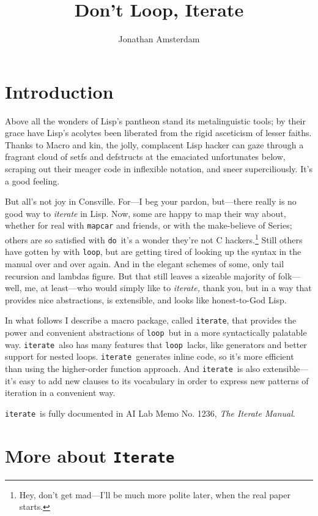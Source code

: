 \documentclass[12pt]{article}
\newcommand{\lisp}{\tt}
\newcommand{\iter}{{\lisp iterate}}
\newcommand{\Iter}{{\lisp Iterate}}
\newcommand{\Do}{{\lisp do}}
\newcommand{\looP}{{\lisp loop}}
\newcommand{\iman}{{\em The Iterate Manual\/}}
\begin{document}
\title{Don't Loop, Iterate}
\author{Jonathan Amsterdam}

\maketitle

\section{Introduction}

Above all the wonders of Lisp's pantheon stand its metalinguistic
tools; by their grace have Lisp's acolytes been liberated from the
rigid asceticism of lesser faiths.  Thanks to Macro and kin, the
jolly, complacent Lisp hacker can gaze through a fragrant cloud of
setfs and defstructs at the emaciated unfortunates below, scraping out
their meager code in inflexible notation, and sneer superciliously.
It's a good feeling.

But all's not joy in Consville.  For---I beg your pardon, but---there
really is no good way to {\em iterate\/} in Lisp.  Now, some are happy
to map their way about, whether for real with {\lisp mapcar} and
friends, or with the make-believe of Series; others are so satisfied
with \Do\ it's a wonder they're not C hackers.\footnote{Hey, don't get
mad---I'll be much more polite later, when the real paper starts.}
Still others have gotten by with \looP, but are getting tired of
looking up the syntax in the manual over and over again.  And in the
elegant schemes of some, only tail recursion and lambdas figure.  But
that still leaves a sizeable majority of folk---well, me, at
least---who would simply like to {\em iterate,} thank you, but in a
way that provides nice abstractions, is extensible, and looks like
honest-to-God Lisp.

In what follows I describe a macro package, called \iter, that
provides the power and convenient abstractions of \looP\ but in a more
syntactically palatable way.  \iter\ also has many features that
\looP\ lacks, like generators and better support for nested loops.
\iter\ generates inline code, so it's more efficient than using the
higher-order function approach.  And \iter\ is also extensible---it's
easy to add new clauses to its vocabulary in order to express new
patterns of iteration in a convenient way.

\iter\ is fully documented in AI Lab Memo No. 1236, \iman.

\section{More about \Iter}
\end{document}

